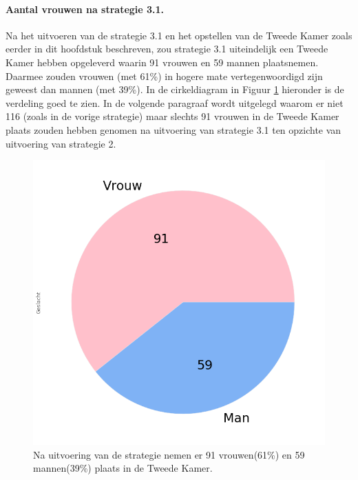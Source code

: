 \paragraph{Aantal vrouwen na strategie 3.1.}
Na het uitvoeren van de strategie 3.1 en het opstellen van de Tweede Kamer zoals eerder in dit hoofdstuk beschreven, zou strategie 3.1 uiteindelijk een Tweede Kamer hebben opgeleverd waarin 91 vrouwen en 59 mannen plaatsnemen. Daarmee zouden vrouwen (met 61\%) in hogere mate vertegenwoordigd zijn geweest dan mannen (met 39\%). In de cirkeldiagram in Figuur \ref{fig:pcS31V} hieronder is de verdeling goed te zien. In de volgende paragraaf wordt uitgelegd waarom er niet 116 (zoals in de vorige strategie) maar slechts 91 vrouwen in de Tweede Kamer plaats zouden hebben genomen na uitvoering van strategie 3.1 ten opzichte van uitvoering van strategie 2.

\begin{figure}[H]
\centering
	\includegraphics[width=0.35\linewidth]{pie_chart_top15_of_topN.png}

			\caption{Na uitvoering van de strategie nemen er 91 vrouwen(61\%) en 59 mannen(39\%) plaats in de Tweede Kamer.}

\label{fig:pcS31V}
\end{figure}

